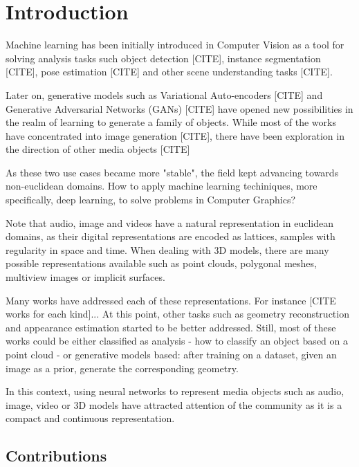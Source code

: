 \section{Introduction}




Machine learning has been initially introduced in Computer Vision as a tool for solving analysis tasks such object detection [CITE], instance segmentation [CITE], pose estimation [CITE] and other scene understanding tasks [CITE]. 

Later on, generative models such as Variational Auto-encoders [CITE] and Generative Adversarial Networks (GANs) [CITE] have opened new possibilities in the realm of learning to generate a family of objects. While most of the works have concentrated into image generation [CITE], there have been exploration in the direction of other media objects [CITE]


As these two use cases became more "stable", the field kept advancing towards non-euclidean domains. How to apply machine learning techiniques, more specifically, deep learning, to solve problems in Computer Graphics?

Note that audio, image and videos have a natural representation in euclidean domains, as their digital representations are encoded as lattices, samples with regularity in space and time. When dealing with 3D models, there are many possible representations available such as point clouds, polygonal meshes, multiview images or implicit surfaces.

Many works have addressed each of these representations. For instance [CITE works for each kind]... At this point, other tasks such as geometry reconstruction and appearance estimation started to be better addressed. Still, most of these works could be either classified as analysis - how to classify an object based on a point cloud - or generative models based: after training on a dataset, given an image as a prior, generate the corresponding geometry.

In this context, using neural networks to represent media objects such as audio, image, video or 3D models have attracted attention of the community as it is a compact and continuous representation. 




\subsection{Contributions}

